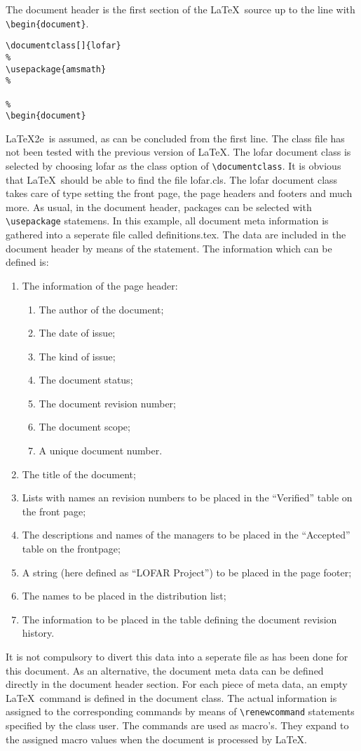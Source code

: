 \documentclass[]{lofar}
\begin{document}
The document header is the first section of the \LaTeX\ source up to
the line with \verb=\begin{document}=.
%
\begin{verbatim}
\documentclass[]{lofar}
%
\usepackage{amsmath}
%

%
\begin{document}
\end{verbatim}
%
\LaTeX2e\ is assumed, as can be concluded from the first line. The class 
file has not been tested with the previous version of \LaTeX. The
lofar document class is selected by choosing lofar as the class option
of \verb=\documentclass=. It is obvious that \LaTeX\ should be able to
find the file \textsf{lofar.cls}.
%
The lofar document class takes care of type setting the front page,
the page headers and footers and much more. As usual, in the document
header, packages can be selected with \verb=\usepackage= statemens. In
this example, all document meta information is gathered into a
seperate file called \textsf{definitions.tex}. The data are included
in the document header by means of the \verb==
statement.  The information which can be defined is:
%
\begin{enumerate}
\item The information of the page header:
        \begin{enumerate}
           \item The author of the document;
           \item The date of issue;
           \item The kind of issue;
           \item The document status;
           \item The document revision number;
           \item The document scope;
           \item A unique document number.
        \end{enumerate}
\item The title of the document;
\item Lists with names an revision numbers to be placed in the
  ``Verified'' table on the front page;
\item The descriptions and names of the managers to be placed in the
  ``Accepted'' table on the frontpage;
\item A string (here defined as ``LOFAR Project'') to be placed in the 
      page footer;
\item The names to be placed in the distribution list;
\item The information to be placed in the table defining the document 
      revision history.
\end{enumerate} 
%
It is not compulsory to divert this data into a seperate file as has
been done for this document. As an alternative, the document meta data
can be defined directly in the document header section. For each piece
of meta data, an empty \LaTeX\ command is defined in the document
class. The actual information is assigned to the corresponding
commands by means of \verb=\renewcommand= statements specified by the
class user. The commands are used as macro's. They expand to the
assigned macro values when the document is processed by \LaTeX.
\end{document}
